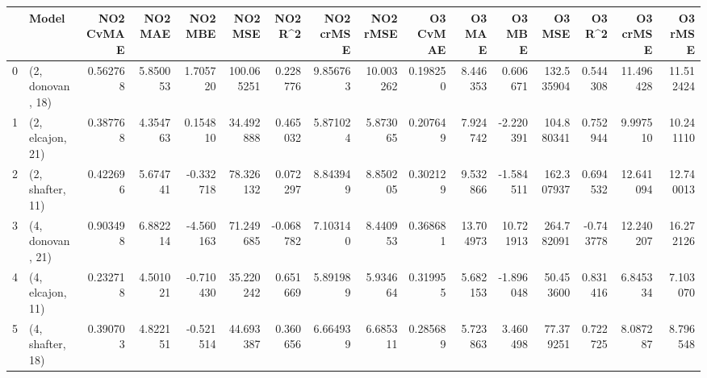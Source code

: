 \begin{tabular}{llrrrrrrrrrrrrrr}
\toprule
{} &             Model &  NO2 CvMAE &   NO2 MAE &   NO2 MBE &     NO2 MSE &   NO2 R\textasciicircum2 &  NO2 crMSE &   NO2 rMSE &  O3 CvMAE &     O3 MAE &     O3 MBE &      O3 MSE &    O3 R\textasciicircum2 &   O3 crMSE &    O3 rMSE \\
\midrule
0 &  (2, donovan, 18) &   0.562768 &  5.850053 &  1.705720 &  100.065251 &  0.228776 &   9.856763 &  10.003262 &  0.198250 &   8.446353 &   0.606671 &  132.535904 &  0.544308 &  11.496428 &  11.512424 \\
1 &  (2, elcajon, 21) &   0.387768 &  4.354763 &  0.154810 &   34.492888 &  0.465032 &   5.871024 &   5.873065 &  0.207649 &   7.924742 &  -2.220391 &  104.880341 &  0.752944 &   9.997510 &  10.241110 \\
2 &  (2, shafter, 11) &   0.422696 &  5.674741 & -0.332718 &   78.326132 &  0.072297 &   8.843949 &   8.850205 &  0.302129 &   9.532866 &  -1.584511 &  162.307937 &  0.694532 &  12.641094 &  12.740013 \\
3 &  (4, donovan, 21) &   0.903498 &  6.882214 & -4.560163 &   71.249685 & -0.068782 &   7.103140 &   8.440953 &  0.368681 &  13.704973 &  10.721913 &  264.782091 & -0.743778 &  12.240207 &  16.272126 \\
4 &  (4, elcajon, 11) &   0.232718 &  4.501021 & -0.710430 &   35.220242 &  0.651669 &   5.891989 &   5.934664 &  0.319955 &   5.682153 &  -1.896048 &   50.453600 &  0.831416 &   6.845334 &   7.103070 \\
5 &  (4, shafter, 18) &   0.390703 &  4.822151 & -0.521514 &   44.693387 &  0.360656 &   6.664939 &   6.685311 &  0.285689 &   5.723863 &   3.460498 &   77.379251 &  0.722725 &   8.087287 &   8.796548 \\
\bottomrule
\end{tabular}
